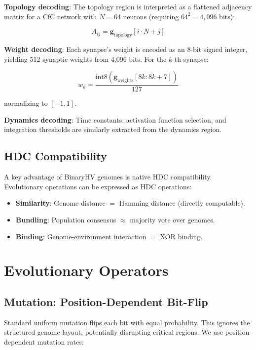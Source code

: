 \documentclass[11pt,a4paper]{article}
\begin{document}
\textbf{Topology decoding}: The topology region is interpreted as a flattened adjacency matrix for a CfC network with $N = 64$ neurons (requiring $64^2 = 4{,}096$ bits):

\begin{equation}
A_{ij} = \mathbf{g}_{\text{topology}}[i \cdot N + j]
\end{equation}

\textbf{Weight decoding}: Each synapse's weight is encoded as an 8-bit signed integer, yielding 512 synaptic weights from 4,096 bits. For the $k$-th synapse:

\begin{equation}
w_k = \frac{\text{int8}(\mathbf{g}_{\text{weights}}[8k : 8k+7])}{127}
\end{equation}

normalizing to $[-1, 1]$.

\textbf{Dynamics decoding}: Time constants, activation function selection, and integration thresholds are similarly extracted from the dynamics region.

\subsection{HDC Compatibility}

A key advantage of BinaryHV genomes is native HDC compatibility. Evolutionary operations can be expressed as HDC operations:

\begin{itemize}[nosep]
    \item \textbf{Similarity}: Genome distance $= $ Hamming distance (directly computable).
    \item \textbf{Bundling}: Population consensus $\approx$ majority vote over genomes.
    \item \textbf{Binding}: Genome-environment interaction $=$ XOR binding.
\end{itemize}

\section{Evolutionary Operators}

\subsection{Mutation: Position-Dependent Bit-Flip}

Standard uniform mutation flips each bit with equal probability. This ignores the structured genome layout, potentially disrupting critical regions. We use position-dependent mutation rates:
\end{document}
